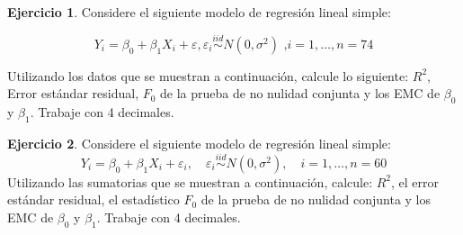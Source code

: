 \documentclass[
  11pt,
]{book}
\theoremstyle{definition}
\theoremstyle{definition}
\theoremstyle{definition}
\newtheorem{exercise}{Ejercicio}[chapter]
\theoremstyle{definition}
\theoremstyle{remark}
\begin{document}
\begin{exercise}

Considere el siguiente modelo de regresión lineal simple:

\[
Y_i = \beta_0 + \beta_1X_i + \varepsilon, \varepsilon_i \overset{iid}{\sim} N(0, \sigma^2) \text{ ,} i = 1, \ldots, n = 74
\]

Utilizando los datos que se muestran a continuación, calcule lo siguiente: \(R^2\), Error estándar residual, \(F_0\) de la prueba de no nulidad conjunta y los EMC de \(\beta_0\) y \(\beta_1\). Trabaje con 4 decimales.

\begin{table}[H]
\centering
{}
\end{table}

\end{exercise}

\begin{exercise}

Considere el siguiente modelo de regresión lineal simple:
\[
Y_i=\beta_0+\beta_1 X_i+\varepsilon_i,\quad \varepsilon_i\overset{iid}{\sim}N(0,\sigma^2),\quad i=1,\ldots,n=60
\]
Utilizando las sumatorias que se muestran a continuación, calcule: \(R^2\), el error estándar residual, el estadístico \(F_0\) de la prueba de no nulidad conjunta y los EMC de \(\beta_0\) y \(\beta_1\). Trabaje con 4 decimales.

\begin{table}[H]
\centering
{}
\end{table}

\end{exercise}
\end{document}
